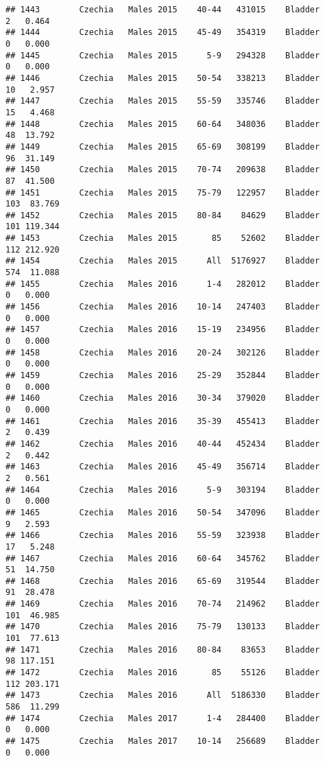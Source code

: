 \documentclass[
]{article}
\begin{document}
\begin{verbatim}
## 1443        Czechia   Males 2015    40-44   431015    Bladder      2   0.464
## 1444        Czechia   Males 2015    45-49   354319    Bladder      0   0.000
## 1445        Czechia   Males 2015      5-9   294328    Bladder      0   0.000
## 1446        Czechia   Males 2015    50-54   338213    Bladder     10   2.957
## 1447        Czechia   Males 2015    55-59   335746    Bladder     15   4.468
## 1448        Czechia   Males 2015    60-64   348036    Bladder     48  13.792
## 1449        Czechia   Males 2015    65-69   308199    Bladder     96  31.149
## 1450        Czechia   Males 2015    70-74   209638    Bladder     87  41.500
## 1451        Czechia   Males 2015    75-79   122957    Bladder    103  83.769
## 1452        Czechia   Males 2015    80-84    84629    Bladder    101 119.344
## 1453        Czechia   Males 2015       85    52602    Bladder    112 212.920
## 1454        Czechia   Males 2015      All  5176927    Bladder    574  11.088
## 1455        Czechia   Males 2016      1-4   282012    Bladder      0   0.000
## 1456        Czechia   Males 2016    10-14   247403    Bladder      0   0.000
## 1457        Czechia   Males 2016    15-19   234956    Bladder      0   0.000
## 1458        Czechia   Males 2016    20-24   302126    Bladder      0   0.000
## 1459        Czechia   Males 2016    25-29   352844    Bladder      0   0.000
## 1460        Czechia   Males 2016    30-34   379020    Bladder      0   0.000
## 1461        Czechia   Males 2016    35-39   455413    Bladder      2   0.439
## 1462        Czechia   Males 2016    40-44   452434    Bladder      2   0.442
## 1463        Czechia   Males 2016    45-49   356714    Bladder      2   0.561
## 1464        Czechia   Males 2016      5-9   303194    Bladder      0   0.000
## 1465        Czechia   Males 2016    50-54   347096    Bladder      9   2.593
## 1466        Czechia   Males 2016    55-59   323938    Bladder     17   5.248
## 1467        Czechia   Males 2016    60-64   345762    Bladder     51  14.750
## 1468        Czechia   Males 2016    65-69   319544    Bladder     91  28.478
## 1469        Czechia   Males 2016    70-74   214962    Bladder    101  46.985
## 1470        Czechia   Males 2016    75-79   130133    Bladder    101  77.613
## 1471        Czechia   Males 2016    80-84    83653    Bladder     98 117.151
## 1472        Czechia   Males 2016       85    55126    Bladder    112 203.171
## 1473        Czechia   Males 2016      All  5186330    Bladder    586  11.299
## 1474        Czechia   Males 2017      1-4   284400    Bladder      0   0.000
## 1475        Czechia   Males 2017    10-14   256689    Bladder      0   0.000

\end{verbatim}
\end{document}
